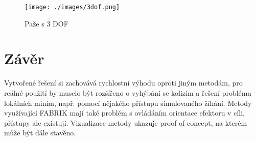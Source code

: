 \documentclass[czech]{pyt-report}
\begin{document}
\begin{figure}[h]
  \centering\leavevmode
  \texttt{[image: ./images/3dof.png]}\vskip-0.5cm
  \medskip
  \caption{Paže s 3 DOF}
  \label{fig:second-scene}
\end{figure}

\section{Závěr}
\label{sec:zaver}
Vytvořené řešení si zachovává rychlostní výhodu oproti jiným metodám, pro reálné použití by muselo být rozšířeno o vyhýbání se kolizím\cite{bib:fabrik-obstacle-avoidance} a řešení problému lokálních minim, např. pomocí nějakého přístupu simulovaného žíhání. Metody využívající FABRIK mají také problém s ovládáním orientace efektoru v cíli, přístupy ale existují\cite{bib:fabrik-effector-orientation}. Vizualizace metody ukazuje proof of concept, na kterém může být dále stavěno.

\nocite{bib:fabrik}
\nocite{bib:fabrik-r}
\nocite{bib:unity}
\nocite{bib:fabrik-obstacle-avoidance}
\nocite{bib:fabrik-effector-orientation}
%

\end{document}
